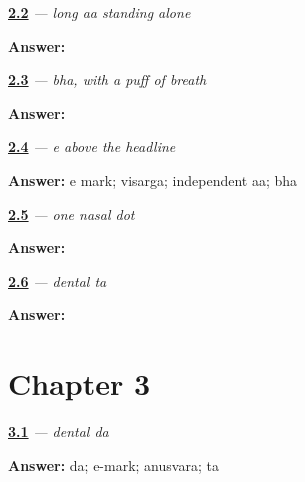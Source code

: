\noindent\begin{minipage}[t]{\linewidth}
\raggedright
\hyperlink{review-MR-W02-aa-independent-guided}{\textbf{2.2}} \emph{ — long aa standing alone}\par
\small \textbf{Answer:} \par
\end{minipage}\par\medskip

\noindent\begin{minipage}[t]{\linewidth}
\raggedright
\hyperlink{review-MR-W02-bha-guided}{\textbf{2.3}} \emph{ — bha, with a puff of breath}\par
\small \textbf{Answer:} \par
\end{minipage}\par\medskip

\noindent\begin{minipage}[t]{\linewidth}
\raggedright
\hyperlink{review-MR-W02-e-matra-r1}{\textbf{2.4}} \emph{ — e above the headline}\par
\small \textbf{Answer:} e mark; visarga; independent aa; bha\par
\end{minipage}\par\medskip

\noindent\begin{minipage}[t]{\linewidth}
\raggedright
\hyperlink{review-MR-W02-anusvara-guided}{\textbf{2.5}} \emph{ — one nasal dot}\par
\small \textbf{Answer:} \par
\end{minipage}\par\medskip

\noindent\begin{minipage}[t]{\linewidth}
\raggedright
\hyperlink{review-MR-W02-ta-delayed}{\textbf{2.6}} \emph{ — dental ta}\par
\small \textbf{Answer:} \par
\end{minipage}\par\medskip

\section*{Chapter 3}

\noindent\begin{minipage}[t]{\linewidth}
\raggedright
\hyperlink{review-MR-W03-da-r1}{\textbf{3.1}} \emph{ — dental da}\par
\small \textbf{Answer:} da; e-mark; anusvara; ta\par
\end{minipage}\par\medskip

